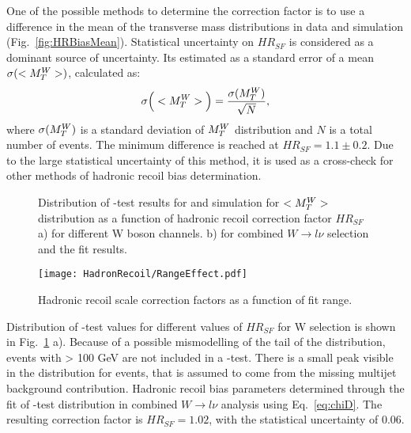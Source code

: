One of the possible methods to determine the correction factor is to use a difference in the mean of the transverse mass distributions in data and simulation (Fig.~\ref{fig:HRBiasMean}). Statistical uncertainty on $HR_{SF}$ is considered as a dominant source of uncertainty. Its estimated as a standard error of a mean $\sigma ( <M_T^W> ) $, calculated as:
\begin{equation}\label{eq:MeanErr}
\sigma \Big( <M_T^W> \Big) = \frac{\sigma( M_T^W )}{\sqrt N},
\end{equation}
where $\sigma(M_T^W)$ is a standard deviation of $M_T^W$ distribution and $N$ is a total number of events. The minimum difference is reached at $HR_{SF}=1.1\pm0.2$. Due to the large statistical uncertainty of this method, it is used as a cross-check for other methods of hadronic recoil bias determination.

\begin{figure}[!tbp]
\begin{minipage}[h]{0.49\linewidth}
\end{minipage}
\hfill
\begin{minipage}[h]{0.49\linewidth}
\end{minipage}
\caption{Distribution of \chiD-test results for and simulation  for $<M_T^W>$ distribution as a function of hadronic recoil correction factor $HR_{SF}$ a) for different W boson channels. 
b) for combined $W \to l \nu$ selection and the \chiD fit results.}
\label{mtWChi2}
\end{figure}

\begin{figure}[!tbp]
\centering
\texttt{[image: HadronRecoil/RangeEffect.pdf]}
\caption{Hadronic recoil scale correction factors as a function of \mtw fit range. }
\label{ScaleMtWRange}
\end{figure}

Distribution of \chiD-test values for different values of $HR_{SF}$ for W selection is shown in Fig.~\ref{mtWChi2} a). Because of a possible mismodelling of the tail of the \mtw distribution, events with \mtw > 100 GeV are not included in a \chiD-test. There is a small peak visible in the \chiD distribution for \wenu events, that is assumed to come from the missing multijet background contribution. Hadronic recoil bias parameters determined through the fit of \chiD-test distribution in combined $W\to l\nu$ analysis using Eq.~\ref{eq:chiD}. The resulting correction factor is $HR_{SF}=1.02$, with the statistical uncertainty of 0.06. 

